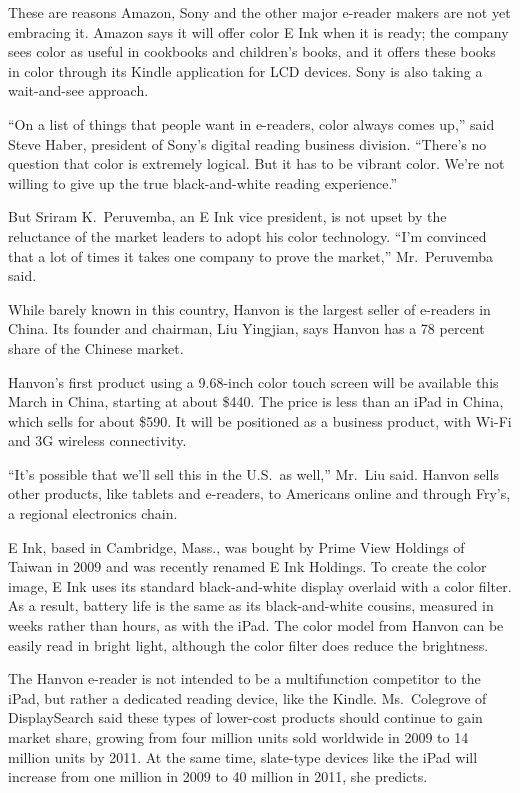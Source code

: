 ﻿\documentclass[12pt]{article}
\begin{document}
These are reasons Amazon, Sony and the other major e-reader makers are not yet embracing it. Amazon
says it will offer color E Ink when it is ready; the company sees color as useful in cookbooks and
children's books, and it offers these books in color through its Kindle application for LCD devices.
Sony is also taking a wait-and-see approach.

``On a list of things that people want in e-readers, color always comes up,'' said Steve Haber,
president of Sony's digital reading business division. ``There's no question that color is extremely
logical. But it has to be vibrant color. We're not willing to give up the true black-and-white
reading experience.''

But Sriram K.~Peruvemba, an E Ink vice president, is not upset by the reluctance of the market
leaders to adopt his color technology. ``I'm convinced that a lot of times it takes one company to
prove the market,'' Mr.~Peruvemba said.

While barely known in this country, Hanvon is the largest seller of e-readers in China. Its founder
and chairman, Liu Yingjian, says Hanvon has a 78 percent share of the Chinese market.

Hanvon's first product using a 9.68-inch color touch screen will be available this March in China,
starting at about \$440. The price is less than an iPad in China, which sells for about \$590. It
will be positioned as a business product, with Wi-Fi and 3G wireless connectivity.

``It's possible that we'll sell this in the U.S.~as well,'' Mr.~Liu said. Hanvon sells other
products, like tablets and e-readers, to Americans online and through Fry's, a regional electronics
chain.

E Ink, based in Cambridge, Mass., was bought by Prime View Holdings of Taiwan in 2009 and was
recently renamed E Ink Holdings. To create the color image, E Ink uses its standard black-and-white
display overlaid with a color filter. As a result, battery life is the same as its black-and-white
cousins, measured in weeks rather than hours, as with the iPad. The color model from Hanvon can be
easily read in bright light, although the color filter does reduce the brightness.

The Hanvon e-reader is not intended to be a multifunction competitor to the iPad, but rather a
dedicated reading device, like the Kindle. Ms.~Colegrove of DisplaySearch said these types of
lower-cost products should continue to gain market share, growing from four million units sold
worldwide in 2009 to 14 million units by 2011. At the same time, slate-type devices like the iPad
will increase from one million in 2009 to 40 million in 2011, she predicts.
\end{document}
